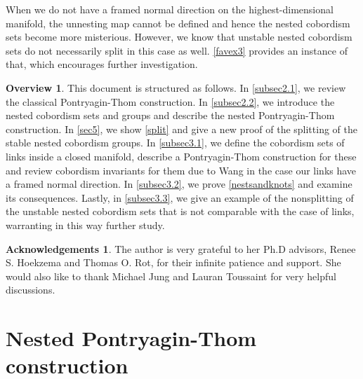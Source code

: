 \documentclass[a4paper, 11pt,reqno]{amsart}
\theoremstyle{plain}
\theoremstyle{definition}
\newtheorem*{acknowledgements*}{Acknowledgements}
\newtheorem*{overview*}{Overview}
\begin{document}
When we do not have a framed normal direction on the highest-dimensional manifold, the unnesting map cannot be defined and hence the nested cobordism sets become more misterious. However, we know that unstable nested cobordism sets do not necessarily split in this case as well. \cref{favex3} provides an instance of that, which encourages further investigation.
\begin{overview*} This document is structured as follows. In \cref{subsec2.1}, we review the classical Pontryagin-Thom construction. In \cref{subsec2.2}, we introduce the nested cobordism sets and groups and describe the nested Pontryagin-Thom construction. In \cref{sec5}, we show \cref{split} and give a new proof of the splitting of the stable nested cobordism groups. In \cref{subsec3.1}, we define the cobordism sets of links inside a closed manifold, describe a Pontryagin-Thom construction for these and review cobordism invariants for them due to Wang in the case our links have a framed normal direction.
In \cref{subsec3.2}, we prove \cref{nestsandknots} and examine its consequences. Lastly, in \cref{subsec3.3}, we give an example of the nonsplitting of the unstable nested cobordism sets that is not comparable with the case of links, warranting in this way further study.
\end{overview*}




\begin{acknowledgements*} The author is very grateful to her Ph.D advisors, Renee S. Hoekzema and Thomas O. Rot, for their infinite patience and support. She would also like to thank Michael Jung and Lauran Toussaint for very helpful discussions.
\end{acknowledgements*}

\section{Nested Pontryagin-Thom construction}\label{sec2}
\end{document}
